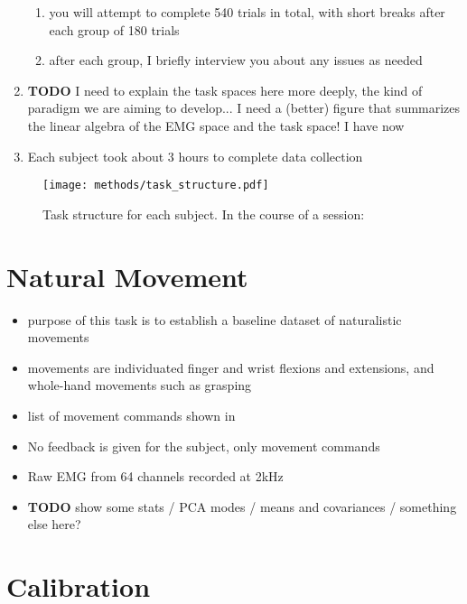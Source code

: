 \documentclass[../main.tex]{subfiles}
\begin{document}
\begin{enumerate}
\begin{enumerate}
    \item you will attempt to complete 540 trials in total, with short breaks after each group of 180 trials
    \item after each group, I briefly interview you about any issues as needed
  \end{enumerate}
  \item \textbf{TODO} I need to explain the task spaces here more deeply, the kind of paradigm we are aiming to develop... I need a (better) figure that summarizes the linear algebra of the EMG space and the task space! I have  now
  \item Each subject took about 3 hours to complete data collection 
  \end{enumerate}

  \begin{figure}[tph]
    \centering
    \texttt{[image: methods/task\_structure.pdf]}
    \caption[Task structure for each subject]{Task structure for each subject. In the course of a session:}\label{fig:task_structure}
  \end{figure}
  



\section{Natural Movement}

\begin{itemize}
  \item purpose of this task is to establish a baseline dataset of naturalistic movements
  \item movements are individuated finger and wrist flexions and extensions, and whole-hand movements such as grasping
  \item list of movement commands shown in 
  \item No feedback is given for the subject, only movement commands
  \item Raw EMG from 64 channels recorded at 2kHz
  \item \textbf{TODO} show some stats / PCA modes / means and covariances / something else here?
\end{itemize}



\section{Calibration}
\end{document}
